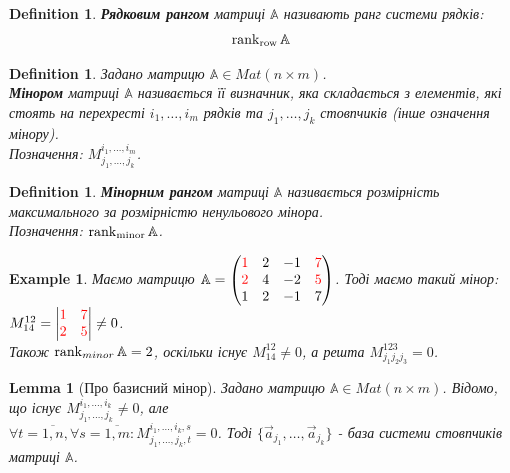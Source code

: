 \documentclass[a4paper, 10pt]{article}
\theoremstyle{theoremdd}
\newtheorem{definition}[theorem]{Definition}
\newtheorem{example}[theorem]{Example}
\newtheorem{lemma}[theorem]{Lemma}
\begin{document}
\begin{definition}
\textbf{Рядковим рангом} матриці $\mathbb{A}$ називають ранг системи рядків:
\begin{align*}
\rank_{\textrm{row}} \mathbb{A}
\end{align*}
\end{definition}

\begin{definition}
Задано матрицю $\mathbb{A} \in Mat(n \times m)$.\\
\textbf{Мінором} матриці $\mathbb{A}$ називається її визначник, яка складається з елементів, які стоять на перехресті $i_1,\dots,i_m$ рядків та $j_1,\dots,j_k$ стовпчиків (інше означення мінору).\\
Позначення: $M_{j_1,\dots,j_k}^{i_1,\dots,i_m}$.
\end{definition}

\begin{definition}
\textbf{Мінорним рангом} матриці $\mathbb{A}$ називається розмірність максимального за розмірністю ненульового мінора.\\
Позначення: $\rank_{\textrm{minor}} \mathbb{A}$.
\end{definition}

\begin{example}
Маємо матрицю $\mathbb{A} = \begin{pmatrix}
\textcolor{red}{1} & 2 & -1 & \textcolor{red}{7} \\
\textcolor{red}{2} & 4 & -2 & \textcolor{red}{5} \\
1 & 2 & -1 & 7
\end{pmatrix}$. Тоді маємо такий мінор:\\
$M_{14}^{12} = \begin{vmatrix}
\textcolor{red}{1} & \textcolor{red}{7} \\
\textcolor{red}{2} & \textcolor{red}{5}
\end{vmatrix} \neq 0$.\\
Також $\rank_{minor} \mathbb{A} = 2$, оскільки існує $M_{14}^{12} \neq 0$, а решта $M^{123}_{j_1j_2j_3} = 0$.
\end{example}

\begin{lemma}[Про базисний мінор]
Задано матрицю $\mathbb{A} \in Mat(n \times m)$. Відомо, що існує $M_{j_1,\dots,j_k}^{i_1,\dots,i_k} \neq 0$, але \\ $\forall t = \overline{1,n}, \forall s = \overline{1,m}: M_{j_1,\dots,j_k,t}^{i_1,\dots,i_k,s} = 0$. Тоді $\{\vec{a}_{j_1},\dots,\vec{a}_{j_k}\}$ - база системи стовпчиків матриці $\mathbb{A}$.
\end{lemma}
\end{document}

